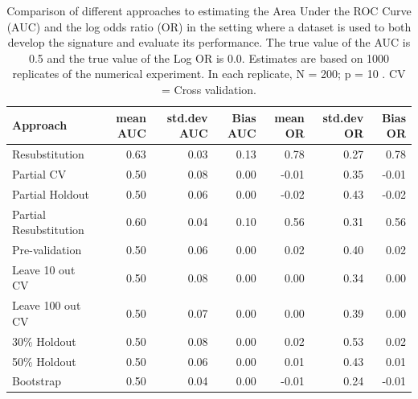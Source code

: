 \documentclass[11pt,]{article}
\begin{document}
\begin{table}

\caption{Comparison of different approaches to estimating the Area Under the ROC Curve (AUC) and the log odds ratio (OR) in the setting where a dataset is used to both develop the signature and evaluate its performance. The true value of the AUC is 0.5 and the true value of the Log OR is 0.0. Estimates are based on 1000 replicates of the numerical experiment. In each replicate,  N = 200; p = 10 . CV = Cross validation. }
\centering
\begin{tabular}[t]{l|r|r|r|r|r|r}
\hline
Approach & mean AUC & std.dev AUC & Bias AUC & mean OR & std.dev OR & Bias OR\\
\hline
Resubstitution & 0.63 & 0.03 & 0.13 & 0.78 & 0.27 & 0.78\\
\hline
Partial CV & 0.50 & 0.08 & 0.00 & -0.01 & 0.35 & -0.01\\
\hline
Partial Holdout & 0.50 & 0.06 & 0.00 & -0.02 & 0.43 & -0.02\\
\hline
Partial Resubstitution & 0.60 & 0.04 & 0.10 & 0.56 & 0.31 & 0.56\\
\hline
Pre-validation & 0.50 & 0.06 & 0.00 & 0.02 & 0.40 & 0.02\\
\hline
Leave 10 out CV & 0.50 & 0.08 & 0.00 & 0.00 & 0.34 & 0.00\\
\hline
Leave 100 out CV & 0.50 & 0.07 & 0.00 & 0.00 & 0.39 & 0.00\\
\hline
30\% Holdout & 0.50 & 0.08 & 0.00 & 0.02 & 0.53 & 0.02\\
\hline
50\% Holdout & 0.50 & 0.06 & 0.00 & 0.01 & 0.43 & 0.01\\
\hline
Bootstrap & 0.50 & 0.04 & 0.00 & -0.01 & 0.24 & -0.01\\
\hline
\end{tabular}
\end{table}
\end{document}
